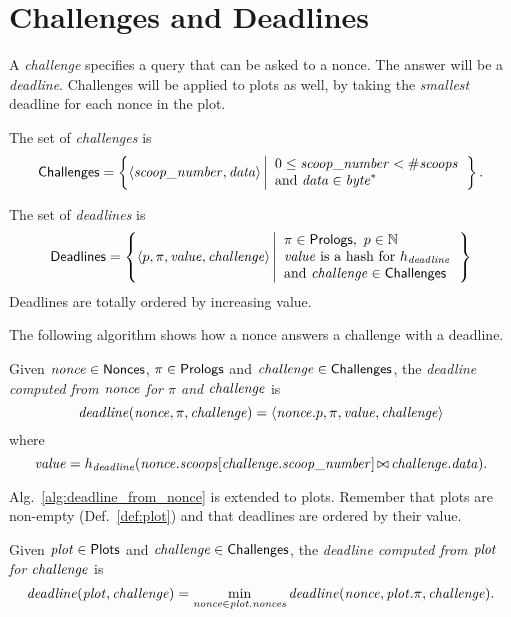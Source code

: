 \section{Challenges and Deadlines}\label{sec:challenges_and_deadlines}

A \emph{challenge} specifies a query that can be asked to a nonce.
The answer will be a \emph{deadline}.
Challenges will be applied to plots as well, by taking
the \emph{smallest} deadline for each nonce in the plot.
%
\begin{definition}[Challenge]\label{def:challenge}
  The set of \emph{challenges} is
  \[
  {\mathsf{Challenges}}=\left\{\langle{\mathit{scoop\_number}},{\mathit{data}}\rangle\left|
  \begin{array}{l}
    0\le{\mathit{scoop\_number}}<{\#\mathit{scoops}}\\
    \text{and }{\mathit{data}}\in\mathit{byte}^*
  \end{array}
  \right.\right\}.
  \]
\end{definition}
%
\begin{definition}[Deadline]\label{def:deadline}
  The set of \emph{deadlines} is
  \[
  {\mathsf{Deadlines}}=\left\{
  \langle p,\pi,\mathit{value},{\mathit{challenge}}\rangle
  \left|\begin{array}{l}
  \pi\in{\mathsf{Prologs}},\ p\in\mathbb{N}\\
  \mathit{value}\text{ is a hash for }h_{\mathit{deadline}}\\
  \text{and }{\mathit{challenge}}\in{\mathsf{Challenges}}
  \end{array}
  \right.
  \right\}
  \]
  Deadlines are totally ordered by increasing value.
\end{definition}
%
The following algorithm shows how a nonce answers a challenge with a deadline.
%
\begin{alg}[$\deadline(\nonce,\pi,\challenge)$]\label{alg:deadline_from_nonce}
  Given ${\mathit{nonce}}\in{\mathsf{Nonces}}$, $\pi\in{\mathsf{Prologs}}$ and ${\mathit{challenge}}\in{\mathsf{Challenges}}$, the
  \emph{deadline computed from ${\mathit{nonce}}$ for $\pi$ and ${\mathit{challenge}}$} is
  \[
  {\mathit{deadline}}({\mathit{nonce}},\pi,{\mathit{challenge}})=\langle{\mathit{nonce}}.p,\pi,\mathit{value},{\mathit{challenge}}\rangle
  \]
  where
  \[
  \mathit{value}=h_{\mathit{deadline}}({\mathit{nonce}}.{\mathit{scoops}}[{\mathit{challenge}}.{\mathit{scoop\_number}}]\operatorname*{\bowtie}{\mathit{challenge}}.{\mathit{data}}).
  \]
\end{alg}
%
Alg.~\ref{alg:deadline_from_nonce} is extended to plots. Remember that plots are non-empty
(Def.~\ref{def:plot}) and that deadlines are ordered by their value.
%
\begin{alg}[$\deadline(\plot,\challenge)$]\label{alg:deadline_from_plot}
  Given ${\mathit{plot}}\in{\mathsf{Plots}}$ and ${\mathit{challenge}}\in{\mathsf{Challenges}}$, the \emph{deadline computed
  from ${\mathit{plot}}$ for ${\mathit{challenge}}$} is
  \[
  {\mathit{deadline}}({\mathit{plot}},{\mathit{challenge}})=\min\limits_{{\mathit{nonce}}\in{\mathit{plot}}.{\mathit{nonces}}}{\mathit{deadline}}({\mathit{nonce}},{\mathit{plot}}.\pi,{\mathit{challenge}}).
  \]
\end{alg}
